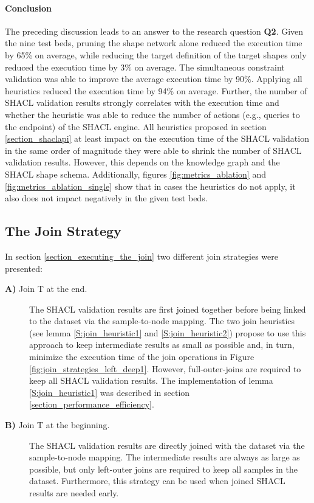 \paragraph{Conclusion} The preceding discussion leads to an answer to the research question \textbf{Q2}. Given the nine test beds, pruning the shape network alone reduced the execution time by 65\% on average, while reducing the target definition of the target shapes only reduced the execution time by 3\% on average. The simultaneous constraint validation was able to improve the average execution time by 90\%. Applying all heuristics reduced the execution time by 94\% on average. Further, the number of SHACL validation results strongly correlates with the execution time and whether the heuristic was able to reduce the number of actions (e.g., queries to the endpoint) of the SHACL engine. All heuristics proposed in section \ref{section_shaclapi} at least impact on the execution time of the SHACL validation in the same order of magnitude they were able to shrink the number of SHACL validation results. However, this depends on the knowledge graph and the SHACL shape schema. Additionally, figures \ref{fig:metrics_ablation} and \ref{fig:metrics_ablation_single} show that in cases the heuristics do not apply, it also does not impact negatively in the given test beds.

\subsection{The Join Strategy}
\label{section_evaluation_validation_engine_join}

In section \ref{section_executing_the_join} two different join strategies were presented: 

\begin{description}
\item[\textbf{A)} Join T at the end.] The SHACL validation results are first joined together before being linked to the dataset via the sample-to-node mapping. The two join heuristics (see lemma \ref{S:join_heuristic1} and \ref{S:join_heuristic2}) propose to use this approach to keep intermediate results as small as possible and, in turn, minimize the execution time of the join operations in Figure \ref{fig:join_strategies_left_deep1}. However, full-outer-joins are required to keep all SHACL validation results. The implementation of lemma \ref{S:join_heuristic1} was described in section \ref{section_performance_efficiency}.  
\item[\textbf{B)} Join T at the beginning.] The SHACL validation results are directly joined with the dataset via the sample-to-node mapping. The intermediate results are always as large as possible, but only left-outer joins are required to keep all samples in the dataset. Furthermore, this strategy can be used when joined SHACL results are needed early.
\end{description}

